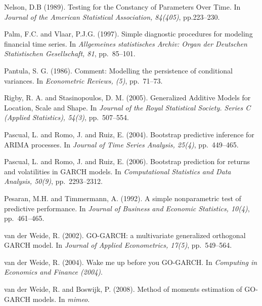 \begin{thebibliography}{}
Nelson, D.B (1989).
\newblock Testing for the Constancy of Parameters Over Time.
\newblock In \emph{Journal of the American Statistical Association, 84(405)}, pp.223--230.

Palm, F.C. and Vlaar, P.J.G. (1997).
\newblock Simple diagnostic procedures for modeling financial time series.
\newblock In \emph{Allgemeines statistisches Archiv: Organ der Deutschen Statistischen Gesellschaft, 81}, pp.~85--101.

Pantula, S. G. (1986).
\newblock Comment: Modelling the persistence of conditional variances.
\newblock In \emph{Econometric Reviews, (5)}, pp.~71--73.

Rigby, R. A. and Stasinopoulos, D. M. (2005).
\newblock Generalized Additive Models for Location, Scale and Shape.
\newblock In \emph{Journal of the Royal Statistical Society. Series C (Applied Statistics), 54(3)}, pp.~507--554.

Pascual, L. and Romo, J. and Ruiz, E. (2004).
\newblock Bootstrap predictive inference for ARIMA processes.
\newblock In \emph{Journal of Time Series Analysis, 25(4)}, pp.~449--465.

Pascual, L. and Romo, J. and Ruiz, E. (2006).
\newblock Bootstrap prediction for returns and volatilities in GARCH models.
\newblock In \emph{Computational Statistics and Data Analysis, 50(9)}, pp.~2293--2312.

Pesaran, M.H. and Timmermann, A. (1992).
\newblock A simple nonparametric test of predictive performance.
\newblock In \emph{Journal of Business and Economic Statistics, 10(4)}, pp.~461--465.

van der Weide, R. (2002).
\newblock GO-GARCH: a multivariate generalized orthogonal GARCH model.
\newblock In \emph{Journal of Applied Econometrics, 17(5)}, pp.~549--564.

van der Weide, R. (2004).
\newblock Wake me up before you GO-GARCH.
\newblock In \emph{Computing in Economics and Finance (2004)}.

van der Weide, R. and Boswijk, P. (2008).
\newblock Method of moments estimation of GO-GARCH models.
\newblock In \emph{mimeo}.


\end{thebibliography}
